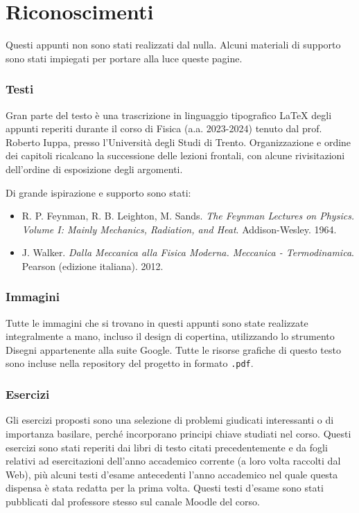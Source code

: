 \section*{Riconoscimenti}
Questi appunti non sono stati realizzati dal nulla.
Alcuni materiali di supporto sono stati impiegati
per portare alla luce queste pagine.

\subsubsection*{Testi}
Gran parte del testo è una trascrizione in linguaggio tipografico \LaTeX\@
degli appunti reperiti durante
il corso di Fisica (a.a. 2023-2024) tenuto dal prof. Roberto Iuppa, presso
l'Università degli Studi di Trento. Organizzazione e ordine dei
capitoli ricalcano la successione delle lezioni frontali, con alcune
rivisitazioni dell'ordine di esposizione degli argomenti.

Di grande ispirazione e supporto sono stati:
\begin{itemize}
    \item R. P. Feynman, R. B. Leighton, M. Sands. \textit{The Feynman Lectures on Physics. Volume I: Mainly Mechanics, Radiation, and Heat}. Addison-Wesley. 1964.
    \item J. Walker. \textit{Dalla Meccanica alla Fisica Moderna. Meccanica - Termodinamica}. Pearson (edizione italiana). 2012.
\end{itemize}

\subsubsection*{Immagini}
Tutte le immagini che si trovano in questi appunti sono state realizzate
integralmente a mano, incluso il design di copertina, utilizzando
lo strumento Disegni appartenente alla suite Google. Tutte le risorse
grafiche di questo testo sono incluse nella repository del progetto in
formato \texttt{.pdf}.

\subsubsection*{Esercizi}
Gli esercizi proposti sono una selezione di problemi
giudicati interessanti o
di importanza basilare, perché incorporano principi chiave studiati nel corso.
Questi esercizi sono stati reperiti dai libri di testo citati precedentemente
e da fogli relativi ad esercitazioni dell'anno accademico corrente (a loro
volta raccolti dal Web), più alcuni testi d'esame antecedenti l'anno accademico
nel quale questa dispensa è stata redatta per la prima volta. Questi testi
d'esame sono stati pubblicati dal professore stesso sul canale Moodle del corso.
